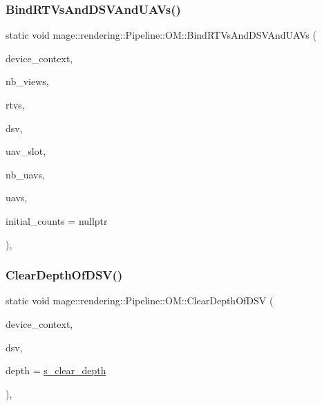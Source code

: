 \subsubsection{\texorpdfstring{Bind\+R\+T\+Vs\+And\+D\+S\+V\+And\+U\+A\+Vs()}{BindRTVsAndDSVAndUAVs()}}
{\footnotesize\ttfamily static void mage\+::rendering\+::\+Pipeline\+::\+O\+M\+::\+Bind\+R\+T\+Vs\+And\+D\+S\+V\+And\+U\+A\+Vs (\begin{DoxyParamCaption}\item[{I\+D3\+D11\+Device\+Context \&}]{device\+\_\+context,  }\item[{\hyperlink{namespacemage_a41c104c036fba3756a74e19f793eeaa1}{U32}}]{nb\+\_\+views,  }\item[{I\+D3\+D11\+Render\+Target\+View $\ast$const $\ast$}]{rtvs,  }\item[{I\+D3\+D11\+Depth\+Stencil\+View $\ast$}]{dsv,  }\item[{\hyperlink{namespacemage_a41c104c036fba3756a74e19f793eeaa1}{U32}}]{uav\+\_\+slot,  }\item[{\hyperlink{namespacemage_a41c104c036fba3756a74e19f793eeaa1}{U32}}]{nb\+\_\+uavs,  }\item[{I\+D3\+D11\+Unordered\+Access\+View $\ast$const $\ast$}]{uavs,  }\item[{const \hyperlink{namespacemage_a41c104c036fba3756a74e19f793eeaa1}{U32} $\ast$}]{initial\+\_\+counts = {\ttfamily nullptr} }\end{DoxyParamCaption})\hspace{0.3cm}{\ttfamily [static]}, {\ttfamily [noexcept]}}

\hypertarget{structmage_1_1rendering_1_1_pipeline_1_1_o_m_a61d92a091182b3fbfb574588a1a5ffb7}{}\label{structmage_1_1rendering_1_1_pipeline_1_1_o_m_a61d92a091182b3fbfb574588a1a5ffb7} 
\subsubsection{\texorpdfstring{Clear\+Depth\+Of\+D\+S\+V()}{ClearDepthOfDSV()}}
{\footnotesize\ttfamily static void mage\+::rendering\+::\+Pipeline\+::\+O\+M\+::\+Clear\+Depth\+Of\+D\+SV (\begin{DoxyParamCaption}\item[{I\+D3\+D11\+Device\+Context \&}]{device\+\_\+context,  }\item[{I\+D3\+D11\+Depth\+Stencil\+View $\ast$}]{dsv,  }\item[{\hyperlink{namespacemage_aa97e833b45f06d60a0a9c4fc22ae02c0}{F32}}]{depth = {\ttfamily \hyperlink{structmage_1_1rendering_1_1_pipeline_1_1_o_m_a9eb4fec4852a3ca2e588a90818a706ec}{s\+\_\+clear\+\_\+depth}} }\end{DoxyParamCaption})\hspace{0.3cm}{\ttfamily [static]}, {\ttfamily [noexcept]}}

